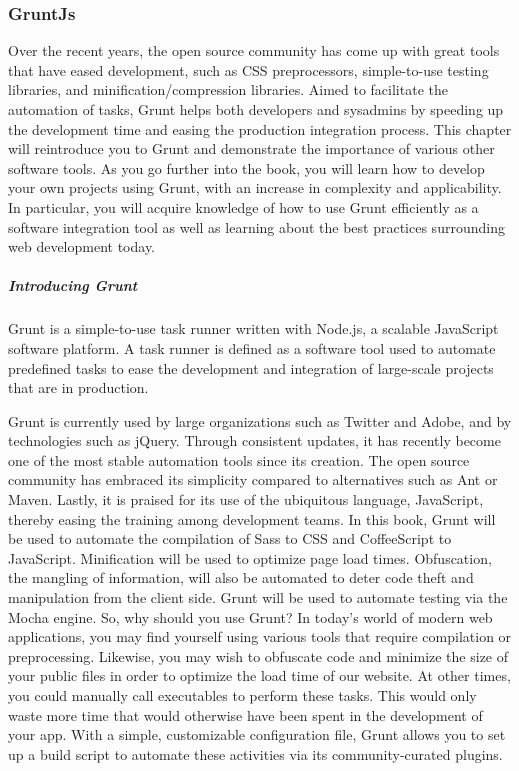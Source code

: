 \subsubsection{GruntJs}
Over the recent years, the open source community has come up with great tools that
have eased development, such as CSS preprocessors, simple-to-use testing libraries,
and minification/compression libraries. Aimed to facilitate the automation of tasks,
Grunt helps both developers and sysadmins by speeding up the development time
and easing the production integration process.
This chapter will reintroduce you to Grunt and demonstrate the importance
of various other software tools. As you go further into the book, you will learn
how to develop your own projects using Grunt, with an increase in complexity
and applicability. In particular, you will acquire knowledge of how to use Grunt
efficiently as a software integration tool as well as learning about the best practices
surrounding web development today.
\subparagraph*{Introducing Grunt}
\hfill \break
Grunt is a simple-to-use task runner written with Node.js, a scalable JavaScript
software platform. A task runner is defined as a software tool used to automate
predefined tasks to ease the development and integration of large-scale projects
that are in production.

Grunt is currently used by large organizations such as Twitter and Adobe, and by
technologies such as jQuery. Through consistent updates, it has recently become
one of the most stable automation tools since its creation. The open source
community has embraced its simplicity compared to alternatives such as Ant or
Maven. Lastly, it is praised for its use of the ubiquitous language, JavaScript, thereby
easing the training among development teams. In this book, Grunt will be used to
automate the compilation of Sass to CSS and CoffeeScript to JavaScript. Minification
will be used to optimize page load times. Obfuscation, the mangling of information,
will also be automated to deter code theft and manipulation from the client side.
Grunt will be used to automate testing via the Mocha engine.
So, why should you use Grunt? In today's world of modern web applications, you
may find yourself using various tools that require compilation or preprocessing.
Likewise, you may wish to obfuscate code and minimize the size of your public files
in order to optimize the load time of our website. At other times, you could manually
call executables to perform these tasks. This would only waste more time that
would otherwise have been spent in the development of your app. With a simple,
customizable configuration file, Grunt allows you to set up a build script to automate
these activities via its community-curated plugins.
